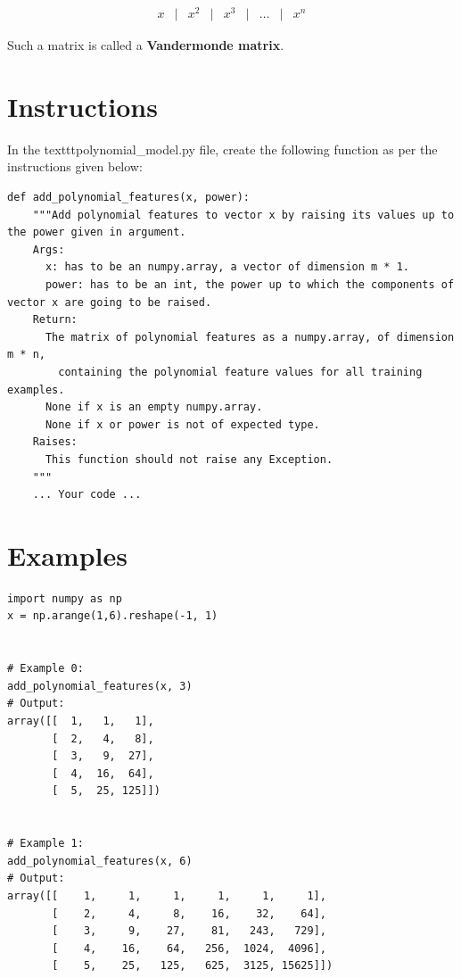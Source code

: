\documentclass{42-en}
\begin{document}
$$
\begin{matrix}
x &|& x^2 &|& x^3 &|& \ldots &|& x^n
\end{matrix}
$$

Such a matrix is called a \textbf{Vandermonde matrix}.

\section*{Instructions}
In the texttt{polynomial\_model.py} file, create the following function as per the instructions given below:

\begin{verbatim}
def add_polynomial_features(x, power):
    """Add polynomial features to vector x by raising its values up to the power given in argument.  
    Args:
      x: has to be an numpy.array, a vector of dimension m * 1.
      power: has to be an int, the power up to which the components of vector x are going to be raised.
    Return:
      The matrix of polynomial features as a numpy.array, of dimension m * n,
        containing the polynomial feature values for all training examples.
      None if x is an empty numpy.array.
      None if x or power is not of expected type.
    Raises:
      This function should not raise any Exception.
    """
    ... Your code ...
\end{verbatim}

\section*{Examples}
\begin{verbatim}
import numpy as np
x = np.arange(1,6).reshape(-1, 1)


# Example 0:
add_polynomial_features(x, 3)
# Output:
array([[  1,   1,   1],
       [  2,   4,   8],
       [  3,   9,  27],
       [  4,  16,  64],
       [  5,  25, 125]])


# Example 1:
add_polynomial_features(x, 6)
# Output:
array([[    1,     1,     1,     1,     1,     1],
       [    2,     4,     8,    16,    32,    64],
       [    3,     9,    27,    81,   243,   729],
       [    4,    16,    64,   256,  1024,  4096],
       [    5,    25,   125,   625,  3125, 15625]])
\end{verbatim}
\end{document}
